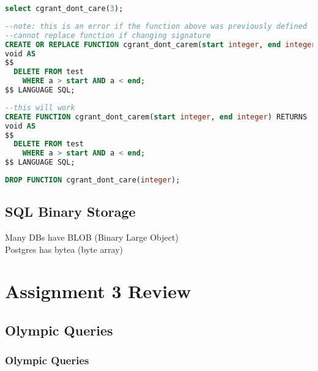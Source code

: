 \documentclass[12pt]{article}
\begin{document}
\begin{lstlisting}[language=sql, caption=calling a function]
  select cgrant_dont_care(3);
\end{lstlisting}

\begin{lstlisting}[language=sql, caption=function with a range]
--note: this is an error if the function above was previously defined
--cannot replace function if changing signature
CREATE OR REPLACE FUNCTION cgrant_dont_carem(start integer, end integer) RETURNS
void AS
$$
  DELETE FROM test
    WHERE a > start AND a < end;
$$ LANGUAGE SQL;
\end{lstlisting}

\begin{lstlisting}[language=sql, caption=function with a range (properly
  defined)]
--this will work
CREATE FUNCTION cgrant_dont_carem(start integer, end integer) RETURNS
void AS
$$
  DELETE FROM test
    WHERE a > start AND a < end;
$$ LANGUAGE SQL;
\end{lstlisting}

\begin{lstlisting}[language=sql, caption=delete function]
  DROP FUNCTION cgrant_dont_care(integer);
\end{lstlisting}

\subsection{SQL Binary Storage}
Many DBs have BLOB (Binary Large Object)\\
Postgres has bytea (byte array)
\section{Assignment 3 Review}
\subsection{Olympic Queries}
\subsubsection{Olympic Queries}
\end{document}
